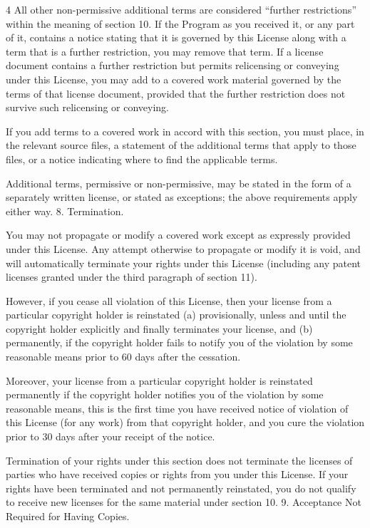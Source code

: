 \documentclass[fontsize=11pt,paper=A4,BCOR=12mm,DIV=13,open=any,listof=totoc,toc=flat]{scrbook}
\begin{document}
{\begin{multicols}{4}
All other non-permissive additional terms are considered “further restrictions” within the meaning of section 10. If the Program as you received it, or any part of it, contains a notice stating that it is governed by this License along with a term that is a further restriction, you may remove that term. If a license document contains a further restriction but permits relicensing or conveying under this License, you may add to a covered work material governed by the terms of that license document, provided that the further restriction does not survive such relicensing or conveying.

If you add terms to a covered work in accord with this section, you must place, in the relevant source files, a statement of the additional terms that apply to those files, or a notice indicating where to find the applicable terms.

Additional terms, permissive or non-permissive, may be stated in the form of a separately written license, or stated as exceptions; the above requirements apply either way.
8. Termination.

You may not propagate or modify a covered work except as expressly provided under this License. Any attempt otherwise to propagate or modify it is void, and will automatically terminate your rights under this License (including any patent licenses granted under the third paragraph of section 11).

However, if you cease all violation of this License, then your license from a particular copyright holder is reinstated (a) provisionally, unless and until the copyright holder explicitly and finally terminates your license, and (b) permanently, if the copyright holder fails to notify you of the violation by some reasonable means prior to 60 days after the cessation.

Moreover, your license from a particular copyright holder is reinstated permanently if the copyright holder notifies you of the violation by some reasonable means, this is the first time you have received notice of violation of this License (for any work) from that copyright holder, and you cure the violation prior to 30 days after your receipt of the notice.

Termination of your rights under this section does not terminate the licenses of parties who have received copies or rights from you under this License. If your rights have been terminated and not permanently reinstated, you do not qualify to receive new licenses for the same material under section 10.
9. Acceptance Not Required for Having Copies.


\end{multicols}}
\end{document}
